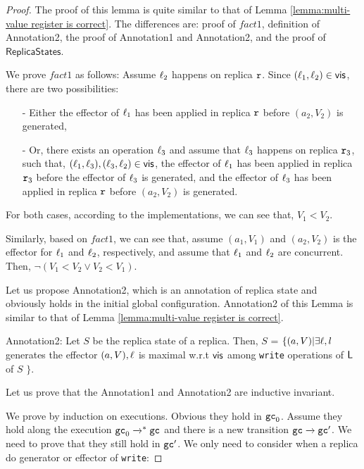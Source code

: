 \begin {proof}

The proof of this lemma is quite similar to that of Lemma \ref{lemma:multi-value register is correct}. The differences are: proof of $fact1$, definition of Annotation2, the proof of Annotation1 and Annotation2, and the proof of $\mathsf{ReplicaStates}$.

We prove $fact1$ as follows: Assume $\ell_2$ happens on replica $\mathtt{r}$. Since $(\ell_1,\ell_2) \in \mathsf{vis}$, there are two possibilities:

\begin{itemize}
\setlength{\itemsep}{0.5pt}
\item[-] Either the effector of $\ell_1$ has been applied in replica $\mathtt{r}$ before $(a_2,V_2)$ is generated,

\item[-] Or, there exists an operation $\ell_3$ and assume that $\ell_3$ happens on replica $\mathtt{r}_3$, such that, $(\ell_1,\ell_3),(\ell_3,\ell_2) \in \mathsf{vis}$, the effector of $\ell_1$ has been applied in replica $\mathtt{r}_3$ before the effector of $\ell_3$ is generated, and the effector of $\ell_3$ has been applied in replica $\mathtt{r}$ before $(a_2,V_2)$ is generated.
\end{itemize}

For both cases, according to the implementations, we can see that, $V_1 < V_2$.

Similarly, based on $fact1$, we can see that, assume $(a_1,V_1)$ and $(a_2,V_2)$ is the effector for $\ell_1$ and $\ell_2$, respectively, and assume that $\ell_1$ and $\ell_2$ are concurrent. Then, $\neg (V_1 < V_2 \vee V_2 < V_1)$.


Let us propose Annotation2, which is an annotation of replica state and obviously holds in the initial global configuration. Annotation2 of this Lemma is similar to that of Lemma \ref{lemma:multi-value register is correct}.

\noindent Annotation2: Let $S$ be the replica state of a replica. Then, $S$ =  $\{ (a,V) \vert \exists \ell, l$ generates the effector $(a,V), \ell$ is maximal w.r.t $\mathsf{vis}$ among {\tt write} operations of $\mathsf{L}$ of $S$ $\}$.


Let us prove that the Annotation1 and Annotation2 are inductive invariant.

We prove by induction on executions. Obvious they hold in $\mathtt{gc}_0$. Assume they hold along the execution $\mathtt{gc}_0 \xrightarrow{}^* \mathtt{gc}$ and there is a new transition $\mathtt{gc} \xrightarrow{} \mathtt{gc}'$. We need to prove that they still hold in $\mathtt{gc}'$. We only need to consider when a replica do generator or effector of {\tt write}:


\end{proof}
